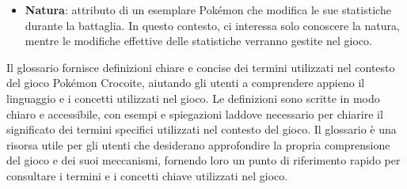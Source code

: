 \documentclass{article}
\begin{document}
\begin{itemize}
\item \textbf{Natura}: attributo di un esemplare Pokémon che modifica le sue statistiche durante la battaglia. In questo contesto, ci interessa solo conoscere la natura, mentre le modifiche effettive delle statistiche verranno gestite nel gioco.
\end{itemize}

Il glossario fornisce definizioni chiare e concise dei termini utilizzati nel contesto del gioco Pokémon Crocoite, aiutando gli utenti a comprendere appieno il linguaggio e i concetti utilizzati nel gioco. Le definizioni sono scritte in modo chiaro e accessibile, con esempi e spiegazioni laddove necessario per chiarire il significato dei termini specifici utilizzati nel contesto del gioco. Il glossario è una risorsa utile per gli utenti che desiderano approfondire la propria comprensione del gioco e dei suoi meccanismi, fornendo loro un punto di riferimento rapido per consultare i termini e i concetti chiave utilizzati nel gioco.
\end{document}
